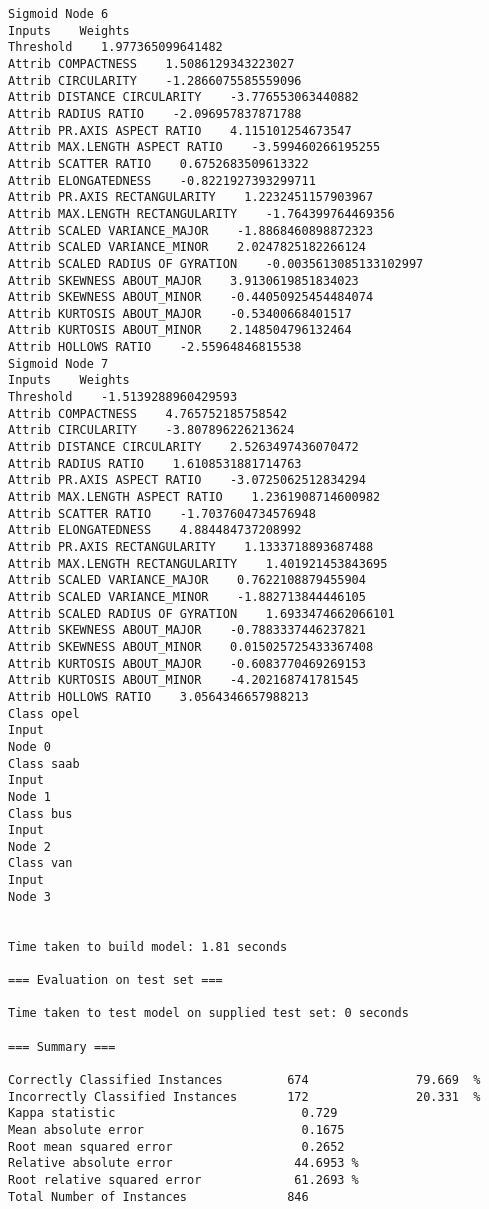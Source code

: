 \documentclass[
	article,			%
	11pt,				%
	oneside,			%
	a4paper,			%
	english,			%
	brazil,				%
	sumario=tradicional
	]{abntex2}
\begin{document}
\begin{lstlisting}
Sigmoid Node 6
Inputs    Weights
Threshold    1.977365099641482
Attrib COMPACTNESS    1.5086129343223027
Attrib CIRCULARITY    -1.2866075585559096
Attrib DISTANCE CIRCULARITY    -3.776553063440882
Attrib RADIUS RATIO    -2.096957837871788
Attrib PR.AXIS ASPECT RATIO    4.115101254673547
Attrib MAX.LENGTH ASPECT RATIO    -3.599460266195255
Attrib SCATTER RATIO    0.6752683509613322
Attrib ELONGATEDNESS    -0.8221927393299711
Attrib PR.AXIS RECTANGULARITY    1.2232451157903967
Attrib MAX.LENGTH RECTANGULARITY    -1.764399764469356
Attrib SCALED VARIANCE_MAJOR    -1.8868460898872323
Attrib SCALED VARIANCE_MINOR    2.0247825182266124
Attrib SCALED RADIUS OF GYRATION    -0.0035613085133102997
Attrib SKEWNESS ABOUT_MAJOR    3.9130619851834023
Attrib SKEWNESS ABOUT_MINOR    -0.44050925454484074
Attrib KURTOSIS ABOUT_MAJOR    -0.53400668401517
Attrib KURTOSIS ABOUT_MINOR    2.148504796132464
Attrib HOLLOWS RATIO    -2.55964846815538
Sigmoid Node 7
Inputs    Weights
Threshold    -1.5139288960429593
Attrib COMPACTNESS    4.765752185758542
Attrib CIRCULARITY    -3.807896226213624
Attrib DISTANCE CIRCULARITY    2.5263497436070472
Attrib RADIUS RATIO    1.6108531881714763
Attrib PR.AXIS ASPECT RATIO    -3.0725062512834294
Attrib MAX.LENGTH ASPECT RATIO    1.2361908714600982
Attrib SCATTER RATIO    -1.7037604734576948
Attrib ELONGATEDNESS    4.884484737208992
Attrib PR.AXIS RECTANGULARITY    1.1333718893687488
Attrib MAX.LENGTH RECTANGULARITY    1.401921453843695
Attrib SCALED VARIANCE_MAJOR    0.7622108879455904
Attrib SCALED VARIANCE_MINOR    -1.882713844446105
Attrib SCALED RADIUS OF GYRATION    1.6933474662066101
Attrib SKEWNESS ABOUT_MAJOR    -0.7883337446237821
Attrib SKEWNESS ABOUT_MINOR    0.015025725433367408
Attrib KURTOSIS ABOUT_MAJOR    -0.6083770469269153
Attrib KURTOSIS ABOUT_MINOR    -4.202168741781545
Attrib HOLLOWS RATIO    3.0564346657988213
Class opel
Input
Node 0
Class saab
Input
Node 1
Class bus
Input
Node 2
Class van
Input
Node 3


Time taken to build model: 1.81 seconds

=== Evaluation on test set ===

Time taken to test model on supplied test set: 0 seconds

=== Summary ===

Correctly Classified Instances         674               79.669  %
Incorrectly Classified Instances       172               20.331  %
Kappa statistic                          0.729 
Mean absolute error                      0.1675
Root mean squared error                  0.2652
Relative absolute error                 44.6953 %
Root relative squared error             61.2693 %
Total Number of Instances              846     


\end{lstlisting}
\end{document}
